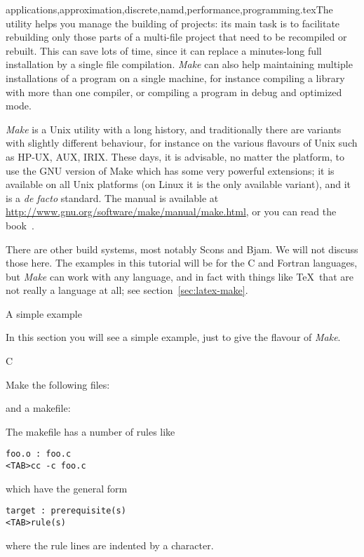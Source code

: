 {applications,approximation,discrete,namd,performance,programming}.texThe  utility helps you manage the building of
projects: its main task is to facilitate rebuilding only those parts 
of a multi-file project that need to be recompiled or rebuilt.
This can save lots of time, since it
can replace a minutes-long full installation by a single file
compilation. \emph{Make} can also help maintaining multiple
installations of a program on a single machine, for instance compiling
a library with more than one compiler, or compiling a program in debug
and optimized mode.

\emph{Make} is a Unix utility with a long history, and traditionally
there are variants with slightly different behaviour, 
for instance on the various
flavours of Unix such as HP-UX, AUX, IRIX. 
These days, it is advisable, no
matter the platform, to use the GNU version of Make which has some
very powerful extensions; it is available on all Unix platforms
(on Linux it is the only available variant), and it is a {\it de
  facto} standard. The manual is available at
\url{http://www.gnu.org/software/make/manual/make.html}, or you can
read the book~\cite{OReilly-GnuMake}.

There are other build systems, most notably Scons and Bjam. We will
not discuss those here. The examples in this tutorial will be for the
C and Fortran languages, but \emph{Make} can work with any language,
and in fact with things like \TeX\ that are not really a language at
all; see section~\ref{sec:latex-make}.

 {A simple example}

\begin{purpose}
In this section you will see a simple example, just to give the flavour of
\emph{Make}.
\end{purpose}

 {C}

Make the following files:

and a makefile:

The makefile has a number of rules like
\begin{verbatim}
foo.o : foo.c
<TAB>cc -c foo.c
\end{verbatim}
which have the general form
\begin{verbatim}
target : prerequisite(s)
<TAB>rule(s)
\end{verbatim}
where the rule lines are indented by a  character.

